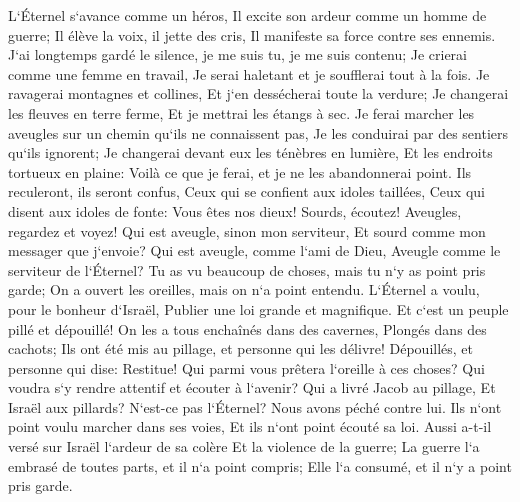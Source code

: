 \verse L`Éternel s`avance comme un héros, Il excite son ardeur comme un homme de guerre; Il élève la voix, il jette des cris, Il manifeste sa force contre ses ennemis. 
\verse J`ai longtemps gardé le silence, je me suis tu, je me suis contenu; Je crierai comme une femme en travail, Je serai haletant et je soufflerai tout à la fois. 
\verse Je ravagerai montagnes et collines, Et j`en dessécherai toute la verdure; Je changerai les fleuves en terre ferme, Et je mettrai les étangs à sec. 
\verse Je ferai marcher les aveugles sur un chemin qu`ils ne connaissent pas, Je les conduirai par des sentiers qu`ils ignorent; Je changerai devant eux les ténèbres en lumière, Et les endroits tortueux en plaine: Voilà ce que je ferai, et je ne les abandonnerai point. 
\verse Ils reculeront, ils seront confus, Ceux qui se confient aux idoles taillées, Ceux qui disent aux idoles de fonte: Vous êtes nos dieux! 
\verse Sourds, écoutez! Aveugles, regardez et voyez! 
\verse Qui est aveugle, sinon mon serviteur, Et sourd comme mon messager que j`envoie? Qui est aveugle, comme l`ami de Dieu, Aveugle comme le serviteur de l`Éternel? 
\verse Tu as vu beaucoup de choses, mais tu n`y as point pris garde; On a ouvert les oreilles, mais on n`a point entendu. 
\verse L`Éternel a voulu, pour le bonheur d`Israël, Publier une loi grande et magnifique. 
\verse Et c`est un peuple pillé et dépouillé! On les a tous enchaînés dans des cavernes, Plongés dans des cachots; Ils ont été mis au pillage, et personne qui les délivre! Dépouillés, et personne qui dise: Restitue! 
\verse Qui parmi vous prêtera l`oreille à ces choses? Qui voudra s`y rendre attentif et écouter à l`avenir? 
\verse Qui a livré Jacob au pillage, Et Israël aux pillards? N`est-ce pas l`Éternel? Nous avons péché contre lui. Ils n`ont point voulu marcher dans ses voies, Et ils n`ont point écouté sa loi. 
\verse Aussi a-t-il versé sur Israël l`ardeur de sa colère Et la violence de la guerre; La guerre l`a embrasé de toutes parts, et il n`a point compris; Elle l`a consumé, et il n`y a point pris garde. 

